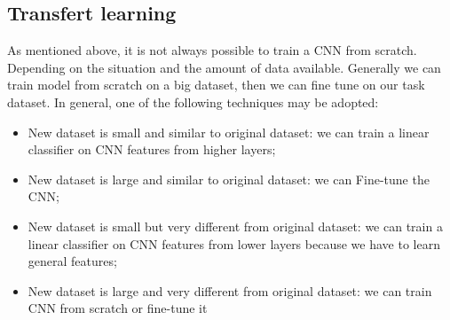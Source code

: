 \subsection{Transfert learning}
As mentioned above, it is not always possible to train a CNN from scratch. Depending on
the situation and the amount of data available. Generally we can train model from
scratch on a big dataset, then we can fine tune on our task dataset. In general,
one of the following techniques may be adopted:
\begin{itemize}
    \item New dataset is small and similar to original dataset: we can train a
          linear classifier on CNN features from higher layers;
    \item New dataset is large and similar to original dataset: we can Fine-tune
          the CNN;
    \item New dataset is small but very different from original dataset: we can
          train a linear classifier on CNN features from lower layers because we
          have to learn general features;
    \item New dataset is large and very different from original dataset: we can
          train CNN from scratch or fine-tune it
\end{itemize}